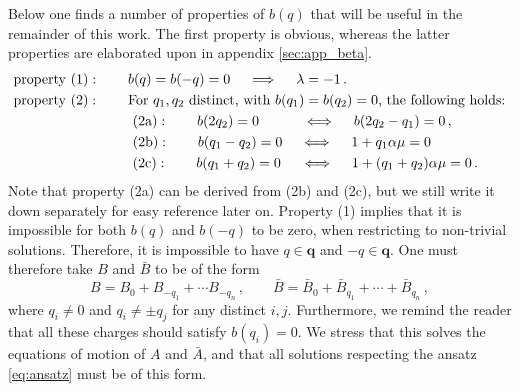 \documentclass[11pt,a4paper]{article}
\numberwithin{equation}{section}
\numberwithin{table}{section}\setlength{\multlinegap}{25pt}
\begin{document}
Below one finds a number of properties of $b(q)$ that will be useful in the remainder of this work. The first property is obvious, whereas the latter properties are elaborated upon in appendix \ref{sec:app_beta}. 
\begin{align}
	&\text{property (1)}:\qquad b(q) = b(-q)=0\quad\implies\quad \lambda = -1\,.\\
\nonumber	&\text{property (2)}:\qquad \text{For $q_1,q_2$ distinct, with $b(q_1)=b(q_2)=0$, the following holds:}\\
	&\hspace{3cm} \text{(2a)}:\qquad b(2q_2)=0\quad\hspace{0.65cm}\iff\quad b(2q_2-q_1)=0\,,\\
\label{eq:2b}	&\hspace{3cm}\text{(2b)}:\qquad b(q_1-q_2)=0\quad\iff\quad 1+q_1\alpha \mu=0\,\\
\label{eq:2c}	&\hspace{3cm}\text{(2c)}:\qquad b(q_1+q_2)=0\quad\hspace{0.05cm}\iff\quad 1+(q_1+q_2)\alpha\mu=0\,.
\end{align}
Note that property (2a) can be derived from (2b) and (2c), but we still write it down separately for easy reference later on. Property (1) implies that it is impossible for both $b(q)$ and $b(-q)$ to be zero, when restricting to non-trivial solutions. Therefore, it is impossible to have $q\in\mathbf{q}$ and $-q\in\mathbf{q}$. One must therefore take $B$ and $\bar{B}$ to be of the form
\begin{equation}\label{eq:B_form}
	B = B_0 + B_{-q_1}+\cdots B_{-q_n}\,,\qquad \bar{B}=\bar{B}_0 + \bar{B}_{q_1}+\cdots+\bar{B}_{q_n}\,,
\end{equation}
where $q_i\neq 0$ and $q_i\neq \pm q_j$ for any distinct $i,j$. Furthermore, we remind the reader that all these charges should satisfy $b(q_i)=0$. We stress that this solves the equations of motion of $A$ and $\bar{A}$, and that all solutions respecting the ansatz \eqref{eq:ansatz} must be of this form. 
\end{document}
